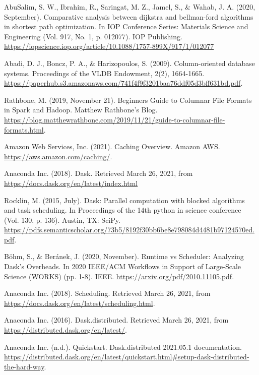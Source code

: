 \documentclass[11pt, oneside]{book}
\begin{document}
\begin{thebibliography}{111}
 AbuSalim, S. W., Ibrahim, R., Saringat, M. Z., Jamel, S., \& Wahab, J. A. (2020, September). Comparative analysis between dijkstra and bellman-ford algorithms in shortest path optimization. In IOP Conference Series: Materials Science and Engineering (Vol. 917, No. 1, p. 012077). IOP Publishing. \url{https://iopscience.iop.org/article/10.1088/1757-899X/917/1/012077}

 Abadi, D. J., Boncz, P. A., \& Harizopoulos, S. (2009). Column-oriented database systems. Proceedings of the VLDB Endowment, 2(2), 1664-1665. \url{https://paperhub.s3.amazonaws.com/741f4f9f3201baa76ddf05d3bff631bd.pdf}.

 Rathbone, M. (2019, November 21). Beginners Guide to Columnar File Formats in Spark and Hadoop. Matthew Rathbone's Blog. \url{https://blog.matthewrathbone.com/2019/11/21/guide-to-columnar-file-formats.html}.

 Amazon Web Services, Inc. (2021). Caching Overview. Amazon AWS. \url{https://aws.amazon.com/caching/}. 

 Anaconda Inc. (2018). Dask. Retrieved March 26, 2021, from \url{https://docs.dask.org/en/latest/index.html}

 Rocklin, M. (2015, July). Dask: Parallel computation with blocked algorithms and task scheduling. In Proceedings of the 14th python in science conference (Vol. 130, p. 136). Austin, TX: SciPy. \url{https://pdfs.semanticscholar.org/73b5/8192f30bb6be8e798084d4481b97124570ed.pdf}.

 Böhm, S., \& Beránek, J. (2020, November). Runtime vs Scheduler: Analyzing Dask’s Overheads. In 2020 IEEE/ACM Workflows in Support of Large-Scale Science (WORKS) (pp. 1-8). IEEE. \url{https://arxiv.org/pdf/2010.11105.pdf}.

 Anaconda Inc. (2018). Scheduling. Retrieved March 26, 2021, from \url{https://docs.dask.org/en/latest/scheduling.html}.

 Anaconda Inc. (2016). Dask.distributed. Retrieved March 26, 2021, from \url{https://distributed.dask.org/en/latest/}.

 Anaconda Inc. (n.d.). Quickstart. Dask.distributed 2021.05.1 documentation. \url{https://distributed.dask.org/en/latest/quickstart.html#setup-dask-distributed-the-hard-way}. 


\end{thebibliography}
\end{document}
